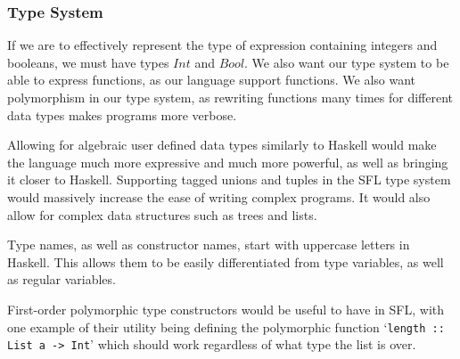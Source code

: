 \subsubsection{Type System}
\label{sec:type_system_design}
If we are to effectively represent the type of expression containing integers and booleans, we must have types $Int$ and $Bool$. We also want our type system to be able to express functions, as our language support functions. We also want polymorphism in our type system, as rewriting functions many times for different data types makes programs more verbose.  

Allowing for algebraic user defined data types similarly to Haskell would make the language much more expressive and much more powerful, as well as bringing it closer to Haskell. Supporting tagged unions and tuples in the \ac{SFL} type system would massively increase the ease of writing complex programs. It would also allow for complex data structures such as trees and lists. 

Type names, as well as constructor names,  start with uppercase letters in Haskell. This allows them to be easily differentiated from type variables, as well as regular variables.

First-order polymorphic type constructors would be useful to have in \ac{SFL}, with one example of their utility being defining the polymorphic function `\verb|length :: List a -> Int|' which should work regardless of what type the list is over. 

% 

